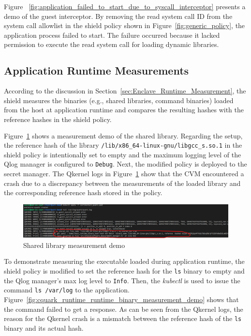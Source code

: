 Figure ~\ref{fig:application_failed_to_start_due_to_syscall_interceptor} presents a demo of the guest interceptor. By removing the read system call ID from the system call allowlist in the shield policy shown in Figure~\ref{fig:generic_policy}, 
the application process failed to start. The failure occurred because it lacked permission to execute the read system call for loading dynamic libraries.

\subsection{Application Runtime Measurements}
\label{sec:eva_qualitativ_runtime_meausre}
According to the discussion in Section~\ref{sec:Enclave_Runtime_Measurement}, the shield measures the binaries (e.g., shared libraries, command binaries) loaded from the host at application runtime and compares the resulting hashes with the reference hashes in the shield policy.  

Figure~\ref{fig:cquark_runtime_runtime_lib_measurement_demo} shows a measurement demo of the shared library. Regarding the setup, the reference hash of the library \texttt{/lib/x86\_64-linux-gnu/libgcc\_s.so.1} in the shield policy is intentionally set to empty and the maximum logging level of the 
Qlog manager is configured to \texttt{Debug}. Next, the modified policy is deployed to the secret manager. The Qkernel logs in Figure~\ref{fig:cquark_runtime_runtime_lib_measurement_demo} show that the \acrshort{CVM} encountered a crash due to a discrepancy between the measurements of the loaded library and the corresponding reference hash stored in the policy.


\begin{figure}[!htb]
    \centering
    \includegraphics[width=1\textwidth]{images/cquark_runtime_runtime_lib_measurement_demo.png}
    \caption[Shared library measurement demo]{Shared library measurement demo}
    \label{fig:cquark_runtime_runtime_lib_measurement_demo}
\end{figure}


To demonstrate measuring the executable loaded during application runtime, the shield policy is modified to set the reference hash for the \texttt{ls} binary to empty and the Qlog manager's max log level to \texttt{Info}. Then, the \emph{kubectl} is used to 
issue the command \texttt{ls /var/log} to the application. Figure~\ref{fig:cquark_runtime_runtime_binary_measurement_demo} shows that the command failed to get a response. As can be seen from the Qkernel logs, the reason for the Qkernel crash is a mismatch between the 
reference hash of the \texttt{ls} binary and its actual hash.


